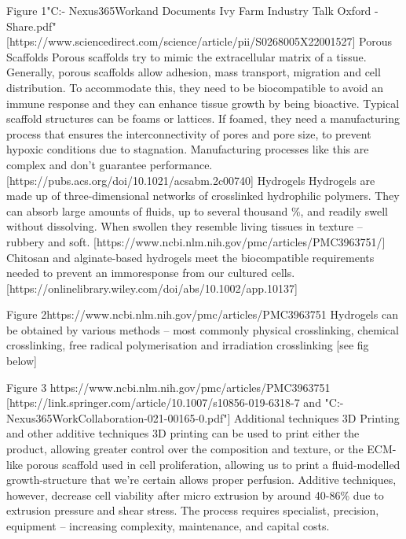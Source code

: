 Figure 1"C:\Users\will\OneDrive - Nexus365\Eng{}\Group Work\Resources and Documents\External{} Ivy Farm Industry Talk Oxford - Share.pdf"
[https://www.sciencedirect.com/science/article/pii/S0268005X22001527]
Porous Scaffolds
Porous scaffolds try to mimic the extracellular matrix of a tissue. Generally, porous scaffolds allow adhesion, mass transport, migration and cell distribution. To accommodate this, they need to be biocompatible to avoid an immune response and they can enhance tissue growth by being bioactive.
Typical scaffold structures can be foams or lattices. If foamed, they need a manufacturing process that ensures the interconnectivity of pores and pore size, to prevent hypoxic conditions due to stagnation. Manufacturing processes like this are complex and don’t guarantee performance.
[https://pubs.acs.org/doi/10.1021/acsabm.2c00740]
Hydrogels
Hydrogels are made up of three-dimensional networks of crosslinked hydrophilic polymers. They can absorb large amounts of fluids, up to several thousand \%, and readily swell without dissolving. When swollen they resemble living tissues in texture – rubbery and soft.
[https://www.ncbi.nlm.nih.gov/pmc/articles/PMC3963751/]
Chitosan and alginate-based hydrogels meet the biocompatible requirements needed to prevent an immoresponse from our cultured cells. [https://onlinelibrary.wiley.com/doi/abs/10.1002/app.10137]
 
Figure 2https://www.ncbi.nlm.nih.gov/pmc/articles/PMC3963751
Hydrogels can be obtained by various methods – most commonly physical crosslinking, chemical crosslinking, free radical polymerisation and irradiation crosslinking [see fig below]
 
Figure 3 https://www.ncbi.nlm.nih.gov/pmc/articles/PMC3963751
[https://link.springer.com/article/10.1007/s10856-019-6318-7 and "C:\Users\will\OneDrive - Nexus365\Eng{}\Group Work\Project Collaboration\Will{}-021-00165-0.pdf"]
Additional techniques
3D Printing and other additive techniques
3D printing can be used to print either the product, allowing greater control over the composition and texture, or the ECM-like porous scaffold used in cell proliferation, allowing us to print a fluid-modelled growth-structure that we’re certain allows proper perfusion. Additive techniques, however, decrease cell viability after micro extrusion by around 40-86\% due to extrusion pressure and shear stress. The process requires specialist, precision, equipment – increasing complexity, maintenance, and capital costs. 
 
